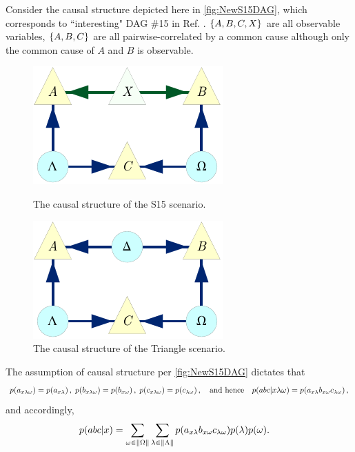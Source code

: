 Consider the causal structure depicted here in \cref{fig:NewS15DAG}, which corresponds to ``interesting" DAG \#15 in Ref. \cite{pusey2014gdag}. $\left\lbrace A,B,C,X\right\rbrace$ are all observable variables, $\left\lbrace A,B,C\right\rbrace$ are all pairwise-correlated by a common cause although only the common cause of $A$ and $B$ is observable.


\begin{figure}[H]
\centering
\begin{minipage}[b]{0.49\linewidth}
\centering
\includegraphics[scale=1]{NewS15DAG.pdf}
\caption{The causal structure of the S15 scenario.}\label{fig:NewS15DAG}
\end{minipage}
\hfill
\begin{minipage}[b]{0.49\linewidth}
\centering
\includegraphics[scale=1]{NewTriDAG.pdf}
\caption{The causal structure of the Triangle scenario.}\label{fig:NewTriDAG}
\end{minipage}
\end{figure}

The assumption of causal structure per \cref{fig:NewS15DAG} dictates that
\begin{align}\begin{split}\label{eq:s15structure}
p\lparen a_{x \lambda \omega}\rparen=p\lparen a_{x \lambda}\rparen \,,\; p\lparen b_{x \lambda \omega}\rparen=p\lparen b_{x \omega}\rparen \,,\; p\lparen c_{x \lambda \omega}\rparen=p\lparen c_{\lambda \omega}\rparen \,,\quad\text{and hence}\quad p\lparen a b c | x \lambda \omega\rparen=p\lparen a_{x \lambda} b_{x \omega} c_{\lambda \omega}\rparen\,,
\end{split}\end{align}
and accordingly, 
\begin{align}\label{eq:s15integration}
&p\lparen a b c | x\rparen=\sum\limits_{\omega\in \lVert\Omega\rVert} \sum\limits_{\lambda\in \lVert\Lambda\rVert} p\lparen a_{x \lambda} b_{x \omega} c_{\lambda \omega}\rparen p\lparen\lambda\rparen p\lparen\omega\rparen.
\end{align}

